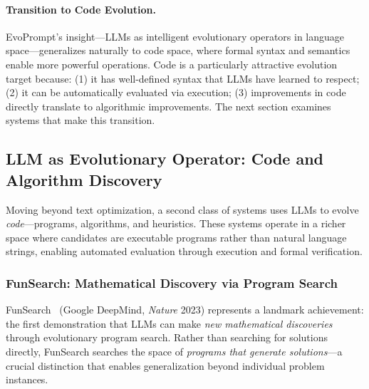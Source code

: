 \paragraph{Transition to Code Evolution.}
EvoPrompt's insight---LLMs as intelligent evolutionary operators in language space---generalizes naturally to code space, where formal syntax and semantics enable more powerful operations. Code is a particularly attractive evolution target because: (1) it has well-defined syntax that LLMs have learned to respect; (2) it can be automatically evaluated via execution; (3) improvements in code directly translate to algorithmic improvements. The next section examines systems that make this transition.


\subsection{LLM as Evolutionary Operator: Code and Algorithm Discovery}
\label{sec:ch4-evo-operator}

Moving beyond text optimization, a second class of systems uses LLMs to evolve \emph{code}---programs, algorithms, and heuristics. These systems operate in a richer space where candidates are executable programs rather than natural language strings, enabling automated evaluation through execution and formal verification.

\subsubsection{FunSearch: Mathematical Discovery via Program Search}

FunSearch~\citep{funsearch2024} (Google DeepMind, \textit{Nature} 2023) represents a landmark achievement: the first demonstration that LLMs can make \emph{new mathematical discoveries} through evolutionary program search. Rather than searching for solutions directly, FunSearch searches the space of \emph{programs that generate solutions}---a crucial distinction that enables generalization beyond individual problem instances.

